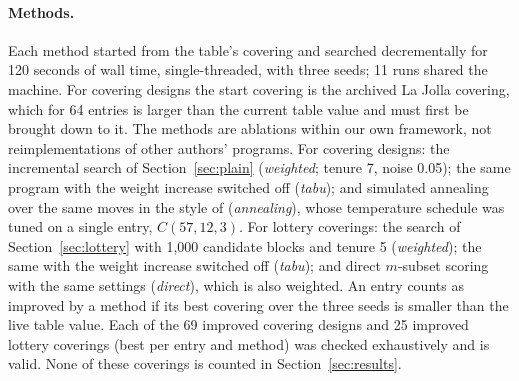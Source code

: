\documentclass[11pt]{article}
\theoremstyle{remark}
\begin{document}
\paragraph{Methods.} Each method started from the table's covering and searched decrementally for 120 seconds of wall
time, single-threaded, with three seeds; 11 runs shared the machine. For covering designs the start covering is the
archived La Jolla covering, which for 64 entries is larger than the current table value and must first be brought
down to it. The methods are ablations within our own framework, not reimplementations of other authors' programs. For
covering designs: the incremental search of Section~\ref{sec:plain} (\emph{weighted}; tenure 7, noise 0.05); the same
program with the weight increase switched off (\emph{tabu}); and simulated annealing over the same moves in the style
of \cite{nurmela1993} (\emph{annealing}), whose temperature schedule was tuned on a single entry, $C(57,12,3)$. For
lottery coverings: the search of Section~\ref{sec:lottery} with 1{,}000 candidate blocks and tenure 5
(\emph{weighted}); the same with the weight increase switched off (\emph{tabu}); and direct $m$-subset scoring with
the same settings (\emph{direct}), which is also weighted. An entry counts as improved by a method if its best
covering over the three seeds is smaller than the live table value. Each of the 69 improved covering designs and 25
improved lottery coverings (best per entry and method) was checked exhaustively and is valid. None of these coverings
is counted in Section~\ref{sec:results}.
\end{document}
